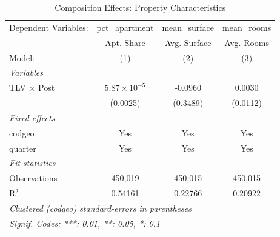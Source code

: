 
\begin{table}[htbp]
   \caption{\label{tab:composition} Composition Effects: Property Characteristics}
   \centering
   \begin{tabular}{lccc}
      \tabularnewline \midrule \midrule
      Dependent Variables: & pct\_apartment        & mean\_surface  & mean\_rooms\\   
                           & Apt. Share            & Avg. Surface   & Avg. Rooms \\   
      Model:               & (1)                   & (2)            & (3)\\  
      \midrule
      \emph{Variables}\\
      TLV $\times$ Post    & $5.87\times 10^{-5}$  & -0.0960        & 0.0030\\   
                           & (0.0025)              & (0.3489)       & (0.0112)\\   
      \midrule
      \emph{Fixed-effects}\\
      codgeo               & Yes                   & Yes            & Yes\\  
      quarter              & Yes                   & Yes            & Yes\\  
      \midrule
      \emph{Fit statistics}\\
      Observations         & 450,019               & 450,015        & 450,015\\  
      R$^2$                & 0.54161               & 0.22766        & 0.20922\\  
      \midrule \midrule
      \multicolumn{4}{l}{\emph{Clustered (codgeo) standard-errors in parentheses}}\\
      \multicolumn{4}{l}{\emph{Signif. Codes: ***: 0.01, **: 0.05, *: 0.1}}\\
   \end{tabular}
\end{table}


